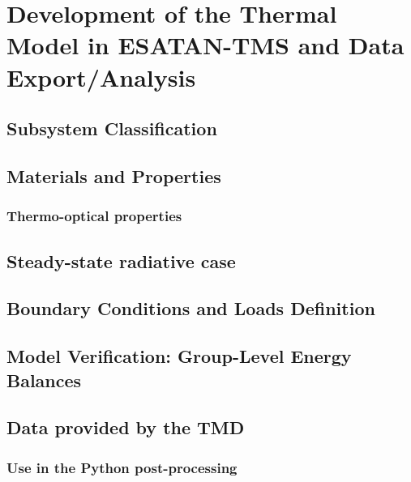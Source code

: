 \chapter{Development of the Thermal Model in ESATAN-TMS and Data Export/Analysis} \label{ch:chapter_05}
\section{Subsystem Classification}
\section{Materials and Properties}
\subsection{Thermo-optical properties}
\section{Steady-state radiative case}
\section{Boundary Conditions and Loads Definition}
\section{Model Verification: Group-Level Energy Balances}
\section{Data provided by the TMD}
\subsection{Use in the Python post-processing}